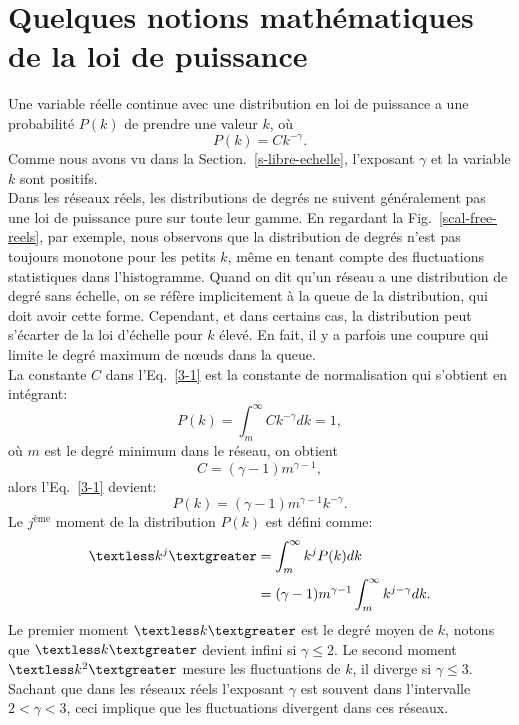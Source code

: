 \section{Quelques notions mathématiques de la loi de puissance}
Une variable réelle continue avec une distribution en loi de puissance a une probabilité $P(k)$ de prendre une valeur $k$, où
\begin{equation}
P(k)=Ck^{-\gamma}.
\label{3-1}
\end{equation}
Comme nous avons vu dans la Section.~\ref{s-libre-echelle}, l'exposant $\gamma$ et la variable $k$ sont positifs. \\
Dans les réseaux réels, les distributions de degrés ne suivent généralement pas une loi de puissance pure sur toute leur gamme.
En regardant la Fig.~\ref{scal-free-reels}, par exemple, nous observons que la distribution de degrés n'est pas toujours monotone pour les petits $k$, même en tenant compte des fluctuations statistiques dans l'histogramme. Quand on dit qu'un réseau a une distribution de degré sans échelle, on se réfère implicitement à la queue de la distribution, qui doit avoir cette forme. Cependant, et dans certains cas, la distribution peut  s'écarter de la loi d'échelle pour $k$ élevé. En fait, il y a parfois une coupure qui limite le degré maximum de nœuds dans la queue.\\
La constante $C$ dans l'Eq.~\eqref{3-1} est la constante de normalisation qui s'obtient en intégrant:
\begin{equation}
P(k)=\int_m^{\infty}Ck^{-\gamma}dk=1,
\label{3-2}
\end{equation}
où $m$ est le degré minimum dans le réseau, on obtient
\begin{equation}
C=(\gamma-1)m^{\gamma-1},
\end{equation}
alors l'Eq.~\eqref{3-1} devient:
\begin{equation}
P(k)=(\gamma-1)m^{\gamma-1}k^{-\gamma}.
\label{3-4}
\end{equation}
Le $j^{\text{ème}}$ moment de la distribution $P(k)$ est défini comme:
\begin{align}
\textless k^j\textgreater&=\int_{m}^{\infty} k^jP(k)dk\nonumber\\
&=(\gamma-1)m^{\gamma-1}\int_{m}^{\infty}k^{j-\gamma}dk.
\end{align}
Le premier moment $\textless k\textgreater$  est le degré moyen de $k$, notons que $\textless k\textgreater$  devient infini si $\gamma\leq2$. Le second moment $\textless k^2\textgreater$ mesure les fluctuations de $k$, il diverge si $\gamma\leq3$. Sachant que dans les réseaux réels l'exposant $\gamma$ est souvent dans l'intervalle $2<\gamma<3$, ceci implique que les fluctuations divergent dans ces réseaux.\\
